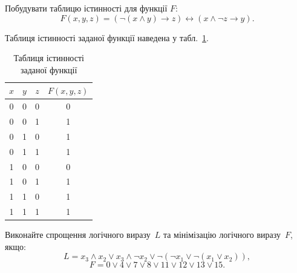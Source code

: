 \documentclass[a4paper,oneside,DIV=12,12pt]{scrartcl}
\renewcommand{\implies}{\rightarrow}
\newcommand{\logicequiv}{\leftrightarrow}
\begin{document}
	\begin{exercise}
		Побудувати таблицю істинності для функції $F$:
		\[
			F(x, y, z) = \left( \neg{(x \land y)} \implies z\right) \logicequiv \left( x \land \neg{z} \implies y \right).
		\]
	\end{exercise}
	
	\begin{solution}
		Таблиця істинності заданої функції наведена у табл.~\ref{tab:ex2-truth-table}.
		
		\begin{table}[!htbp]
		\centering
			\begin{tabular}{cccc}
				\toprule
					$x$ & $y$ & $z$ & $F(x, y, z)$\\
				\midrule
					0   & 0   & 0   & 0\\
					0   & 0   & 1   & 1\\
					0   & 1   & 0   & 1\\
					0   & 1   & 1   & 1\\
					1   & 0   & 0   & 0\\
					1   & 0   & 1   & 1\\
					1   & 1   & 0   & 1\\
					1   & 1   & 1   & 1\\
				\bottomrule
			\end{tabular}
		\caption{Таблиця істинності заданої функції}
		\label{tab:ex2-truth-table}
		\end{table}
	\end{solution}
	
	\begin{exercise}
		Виконайте спрощення логічного виразу~$L$ та мінімізацію логічного виразу~$F$, якщо:
		\[
			L = x_3 \land x_2 \lor x_3 \land \neg{x_2} \lor \neg{(\neg{x_1} \lor \neg{ (x_1 \lor x_2) } )},
		\]
		\[
			F = 0 \lor 4 \lor 7 \lor 8 \lor 11 \lor 12 \lor 13 \lor 15.
		\]
	\end{exercise}
	
\end{document}

